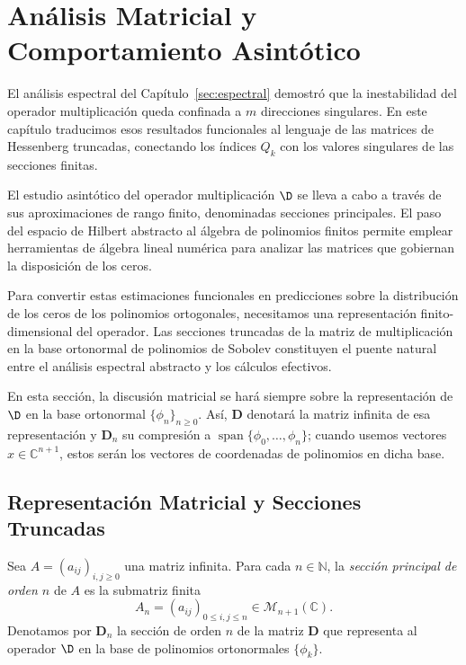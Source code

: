 \chapter{Análisis Matricial y Comportamiento Asintótico}\label{sec:matricial}

El análisis espectral del Capítulo~\ref{sec:espectral} demostró que la inestabilidad del operador multiplicación queda confinada a $m$ direcciones singulares. En este capítulo traducimos esos resultados funcionales al lenguaje de las matrices de Hessenberg truncadas, conectando los índices $Q_k$ con los valores singulares de las secciones finitas.

El estudio asintótico del operador multiplicación $\D$ se lleva a cabo a través de sus aproximaciones de rango finito, denominadas secciones principales. El paso del espacio de Hilbert abstracto al álgebra de polinomios finitos permite emplear herramientas de álgebra lineal numérica para analizar las matrices que gobiernan la disposición de los ceros.

Para convertir estas estimaciones funcionales en predicciones sobre la distribución de los ceros de los polinomios ortogonales, necesitamos una representación finito-dimensional del operador. Las secciones truncadas de la matriz de multiplicación en la base ortonormal de polinomios de Sobolev constituyen el puente natural entre el análisis espectral abstracto y los cálculos efectivos.

En esta sección, la discusión matricial se hará siempre sobre la representación de $\D$ en la base ortonormal $\{\phi_n\}_{n\ge 0}$. Así, $\mathbf{D}$ denotará la matriz infinita de esa representación y $\mathbf{D}_n$ su compresión a $\operatorname{span}\{\phi_0,\dots,\phi_n\}$; cuando usemos vectores $x \in \mathbb{C}^{n+1}$, estos serán los vectores de coordenadas de polinomios en dicha base.

\section{Representación Matricial y Secciones Truncadas}

\begin{defn}\label{def:seccion_truncada}
	Sea $A = (a_{ij})_{i,j \geq 0}$ una matriz infinita. Para cada $n \in \mathbb{N}$, la \emph{sección principal de orden $n$} de $A$ es la submatriz finita
	\[
		A_n = (a_{ij})_{0 \leq i,j \leq n} \in \mathcal{M}_{n+1}(\mathbb{C}).
	\]
	Denotamos por $\mathbf{D}_n$ la sección de orden $n$ de la matriz $\mathbf{D}$ que representa al operador $\D$ en la base de polinomios ortonormales $\{\phi_k\}$.
\end{defn}

